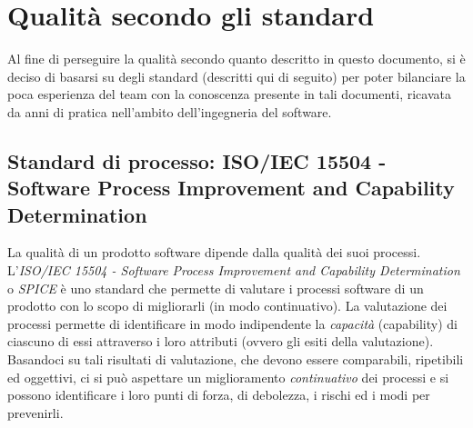 \section{Qualità secondo gli standard}
Al fine di perseguire la qualità secondo quanto descritto in questo documento, si è deciso di basarsi su degli standard (descritti qui di seguito) per poter bilanciare la poca esperienza del team con la conoscenza presente in tali documenti, ricavata da anni di pratica nell'ambito dell'ingegneria del software.
\subsection{Standard di processo: ISO/IEC 15504 - Software Process Improvement and Capability Determination}
\label{AppA:standardProc}
La qualità di un prodotto software dipende dalla qualità dei suoi processi. L'\emph{ISO/IEC 15504 - Software Process Improvement and Capability Determination} o \emph{SPICE} è uno standard che permette di valutare i processi software di un prodotto con lo scopo di migliorarli  (in modo continuativo). La valutazione dei processi permette di identificare in modo indipendente la \emph{capacità} (capability) di ciascuno di essi attraverso i loro attributi (ovvero gli esiti della valutazione). Basandoci su tali risultati di valutazione, che devono essere comparabili, ripetibili ed oggettivi, ci si può aspettare un miglioramento \emph{continuativo} dei processi e si possono identificare i loro punti di forza, di debolezza, i rischi ed i modi per prevenirli.

